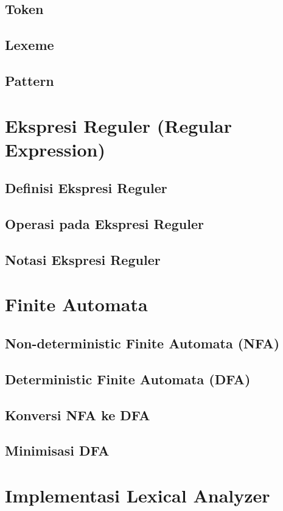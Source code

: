 \documentclass{book}
\begin{document}
         \subsection{Token}
         \subsection{Lexeme}
         \subsection{Pattern}
    \section{Ekspresi Reguler (Regular Expression)}
         \subsection{Definisi Ekspresi Reguler}
         \subsection{Operasi pada Ekspresi Reguler}
         \subsection{Notasi Ekspresi Reguler}
    \section{Finite Automata}
         \subsection{Non-deterministic Finite Automata (NFA)}
         \subsection{Deterministic Finite Automata (DFA)}
         \subsection{Konversi NFA ke DFA}
         \subsection{Minimisasi DFA}
    \section{Implementasi Lexical Analyzer}
\end{document}
